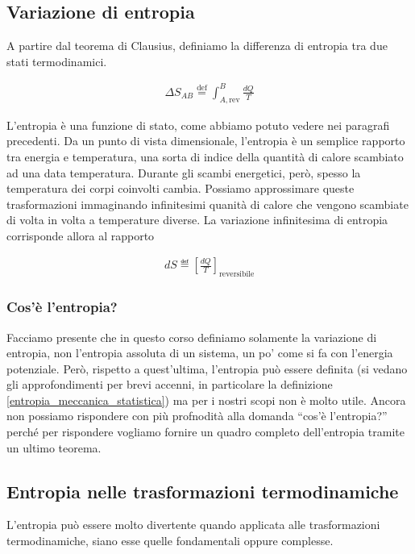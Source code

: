 \subsection{Variazione di entropia}
A partire dal teorema di Clausius, definiamo la differenza di entropia
tra due stati termodinamici.

\begin{align}
    \Delta S_{AB} \stackrel{\text{def}}{=} \int_{A,\text{rev}}^{B} \frac{dQ}{T}\label{variaz_entropia}
\end{align}

L'entropia è una funzione di stato, come abbiamo
potuto vedere nei paragrafi precedenti. Da un punto di vista dimensionale, l'entropia
è un semplice rapporto tra energia e temperatura, una sorta di
indice della quantità di calore scambiato ad una data temperatura.
Durante gli scambi energetici, però, spesso la temperatura dei corpi
coinvolti cambia. Possiamo approssimare queste trasformazioni immaginando
infinitesimi quanità di calore che vengono scambiate di volta in volta
a temperature diverse. La variazione infinitesima di entropia corrisponde
allora al rapporto

\begin{align}
    dS \eqdef \left[\frac{dQ}{T}\right]_\text{reversibile}\label{entropia_infinitesima}
\end{align}

\subsubsection*{Cos'è l'entropia?}
Facciamo presente che in questo corso definiamo solamente la variazione
di entropia, non l'entropia assoluta di un sistema, un po' come si fa
con l'energia potenziale. Però, rispetto a quest'ultima, l'entropia
può essere definita (si vedano gli approfondimenti per brevi accenni,
in particolare la definizione \ref{entropia_meccanica_statistica}) ma
per i nostri scopi non è molto utile. Ancora non possiamo rispondere
con più profnodità alla domanda ``cos'è l'entropia?'' perché per
rispondere vogliamo fornire un quadro completo dell'entropia tramite
un ultimo teorema.


\subsection{Entropia nelle trasformazioni termodinamiche}
L'entropia può essere molto divertente quando applicata alle
trasformazioni termodinamiche, siano esse quelle fondamentali
oppure complesse.

